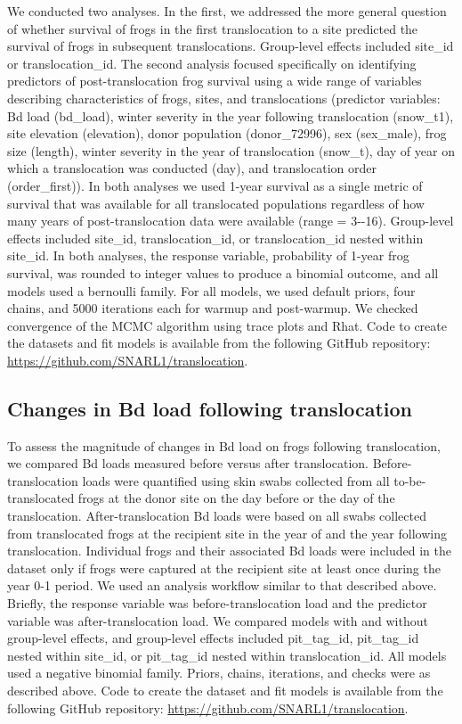 \documentclass[9pt,twocolumn,twoside,lineno]{pnas-new}
\begin{document}
{We conducted two analyses. In the first, we addressed the more general
question of whether survival of frogs in the first translocation to a
site predicted the survival of frogs in subsequent translocations.
Group-level effects included site\_id or translocation\_id. The second
analysis focused specifically on identifying predictors of
post-translocation frog survival using a wide range of variables
describing characteristics of frogs, sites, and translocations
(predictor variables: Bd load (bd\_load), winter severity in the year
following translocation (snow\_t1), site elevation (elevation), donor
population (donor\_72996), sex (sex\_male), frog size (length), winter
severity in the year of translocation (snow\_t), day of year on which a
translocation was conducted (day), and translocation order
(order\_first)). In both analyses we used 1-year survival as a single
metric of survival that was available for all translocated populations
regardless of how many years of post-translocation data were available
(range = 3-\/-16). Group-level effects included site\_id,
translocation\_id, or translocation\_id nested within site\_id. In both
analyses, the response variable, probability of 1-year frog survival,
was rounded to integer values to produce a binomial outcome, and all
models used a bernoulli family. For all models, we used default priors,
four chains, and 5000 iterations each for warmup and post-warmup. We
checked convergence of the MCMC algorithm using trace plots and Rhat.
Code to create the datasets and fit models is available from the
following GitHub repository:
\url{https://github.com/SNARL1/translocation}.

\hypertarget{changes-in-bd-load-following-translocation}{%
\subsection*{Changes in Bd load following
translocation}\label{changes-in-bd-load-following-translocation}}

To assess the magnitude of changes in Bd load on frogs following
translocation, we compared Bd loads measured before versus after
translocation. Before-translocation loads were quantified using skin
swabs collected from all to-be-translocated frogs at the donor site on
the day before or the day of the translocation. After-translocation Bd
loads were based on all swabs collected from translocated frogs at the
recipient site in the year of and the year following translocation.
Individual frogs and their associated Bd loads were included in the
dataset only if frogs were captured at the recipient site at least once
during the year 0-1 period. We used an analysis workflow similar to that
described above. Briefly, the response variable was before-translocation
load and the predictor variable was after-translocation load. We
compared models with and without group-level effects, and group-level
effects included pit\_tag\_id, pit\_tag\_id nested within site\_id, or
pit\_tag\_id nested within translocation\_id. All models used a negative
binomial family. Priors, chains, iterations, and checks were as
described above. Code to create the dataset and fit models is available
from the following GitHub repository:
\url{https://github.com/SNARL1/translocation}.

}
\end{document}
